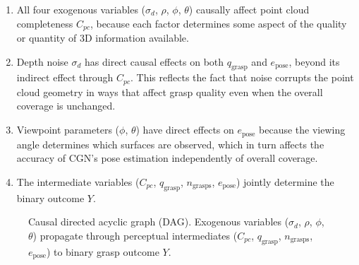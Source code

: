 \documentclass[11pt,a4paper]{report}
\begin{document}
\begin{enumerate}
  \item All four exogenous variables ($\sigma_d$, $\rho$, $\phi$, $\theta$) causally affect point cloud completeness $C_{pc}$, because each factor determines some aspect of the quality or quantity of 3D information available.

  \item Depth noise $\sigma_d$ has direct causal effects on both $q_{\text{grasp}}$ and $e_{\text{pose}}$, beyond its indirect effect through $C_{pc}$. This reflects the fact that noise corrupts the point cloud geometry in ways that affect grasp quality even when the overall coverage is unchanged.

  \item Viewpoint parameters ($\phi$, $\theta$) have direct effects on $e_{\text{pose}}$ because the viewing angle determines which surfaces are observed, which in turn affects the accuracy of CGN's pose estimation independently of overall coverage.

  \item The intermediate variables ($C_{pc}$, $q_{\text{grasp}}$, $n_{\text{grasps}}$, $e_{\text{pose}}$) jointly determine the binary outcome $Y$.
\end{enumerate}

\begin{figure}[t]
  \centering
  \caption{Causal directed acyclic graph (DAG). Exogenous variables ($\sigma_d$, $\rho$, $\phi$, $\theta$) propagate through perceptual intermediates ($C_{pc}$, $q_{\text{grasp}}$, $n_{\text{grasps}}$, $e_{\text{pose}}$) to binary grasp outcome $Y$.}
  \label{fig:causal_dag}
\end{figure}
\end{document}
